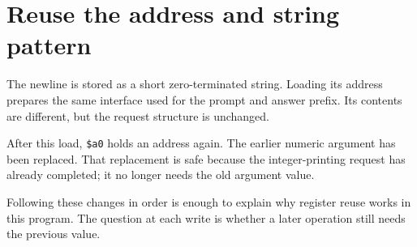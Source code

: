 \section{Reuse the address and string
  pattern}\label{001-console-calculation-p17-reuse-the-address-and-string-pattern}

The newline is stored as a short zero-terminated string. Loading its
address prepares the same interface used for the prompt and answer
prefix. Its contents are different, but the request structure is
unchanged.

After this load, \texttt{\$a0} holds an address again. The earlier
numeric argument has been replaced. That replacement is safe because the
integer-printing request has already completed; it no longer needs the
old argument value.

Following these changes in order is enough to explain why register reuse
works in this program. The question at each write is whether a later
operation still needs the previous value.
